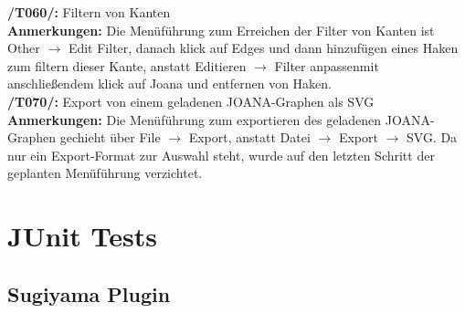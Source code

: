 \textbf{/T060/: }Filtern von Kanten\\
\textbf{Anmerkungen: }Die Menüführung zum Erreichen der Filter von Kanten ist \glqq{}Other $\to$ Edit Filter\grqq, danach klick auf Edges und dann hinzufügen eines Haken zum filtern dieser Kante, anstatt \glqq{}Editieren $\to$ Filter anpassen\grqq mit anschließendem klick auf Joana und entfernen von Haken.\\

\textbf{/T070/: }Export von einem geladenen JOANA-Graphen als SVG\\
\textbf{Anmerkungen: }Die Menüführung zum exportieren des geladenen JOANA-Graphen gechieht über \glqq{}File $\to$ Export\grqq, anstatt \glqq{}Datei $\to$ Export $\to$ SVG\grqq{}. Da nur ein Export-Format zur Auswahl steht, wurde auf den letzten Schritt der geplanten Menüführung verzichtet.\\


\section{JUnit Tests}
\subsection{Sugiyama Plugin}
